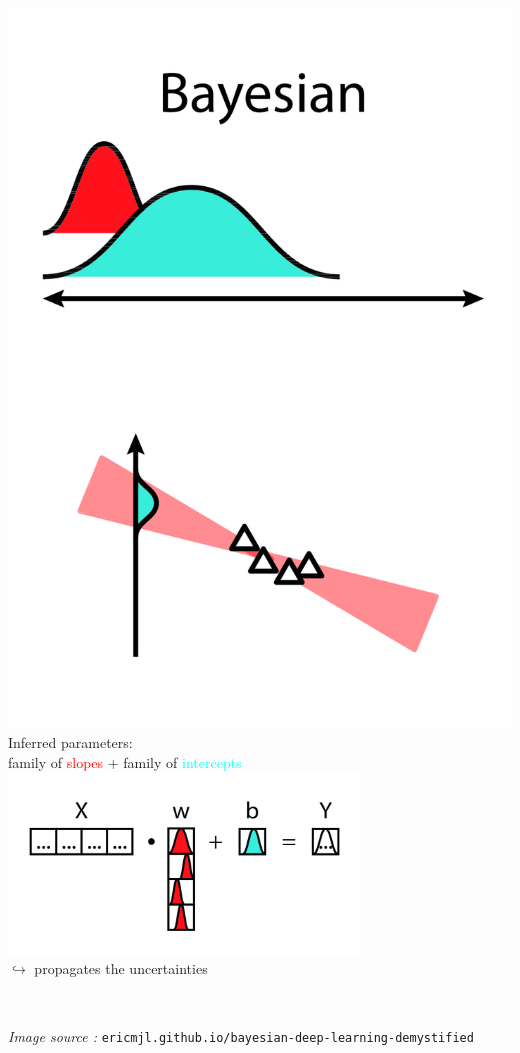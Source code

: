 \documentclass[10pt,xcolor=x11names,compress, show notes]{beamer}%
\begin{document}
\begin{frame}{\insertsectionhead}
\begin{minipage}{0.47\textwidth}
\end{minipage}
 \hfill 
 \begin{minipage}{0.52\textwidth}
 	\centering
	\includegraphics[height=0.7\textwidth]{linreg2.png}\\
	\vfill
	Inferred parameters:\\
	family of \textcolor{red}{slopes} + family of \textcolor{cyan}{intercepts}\\
	\includegraphics[width=0.7\textwidth]{intro2.png}\\
	{ $\hookrightarrow$ propagates the uncertainties}
	\vfill
\end{minipage}\\
\vfill
\begin{center}
	\footnotesize \textit{Image source :} \texttt{ericmjl.github.io/bayesian-deep-learning-demystified}
\end{center}
\end{frame}


\newcommand{\h}{\text{hypothesis}}
\renewcommand{\d}{\text{data}}
\newcommand{\p}{\text{parameters}}
\end{document}
